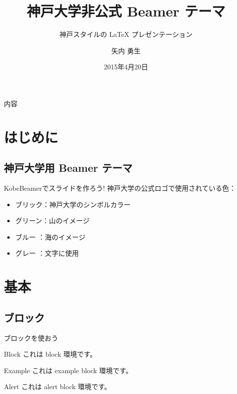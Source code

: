 \documentclass[dvipdfmx]{beamer}
\title[KobeBeamer]{神戸大学非公式 Beamer テーマ}
\subtitle{神戸スタイルの {\LaTeX} プレゼンテーション}
\author{矢内 勇生}
\institute{法学研究科}
\date{2015年4月20日}
\begin{document}
\begin{frame}
 \maketitle
\end{frame}

\begin{frame}{内容} 
  \tableofcontents
\end{frame}

\section{はじめに}
\subsection{神戸大学用 Beamer テーマ}

\begin{frame}{KobeBeamerでスライドを作ろう!}
 神戸大学の公式ロゴで使用されている色：
  \begin{itemize}
    \item \textcolor{kobebrick}{ブリック}：神戸大学のシンボルカラー
    \item \textcolor{kobegreen}{グリーン}：山のイメージ
    \item \textcolor{kobeblue}{ブルー} ：海のイメージ
    \item \textcolor{kobegray}{グレー} ：文字に使用
  \end{itemize}
\end{frame}



\section{基本}


\subsection{ブロック}

\begin{frame}{ブロックを使おう}
  \begin{block}{Block}
   これは block 環境です。
  \end{block}
  \pause
  \begin{exampleblock}{Example}
   これは example block 環境です。 
  \end{exampleblock}
 \pause
  \begin{alertblock}{Alert}
   これは alert block 環境です。
  \end{alertblock}
\end{frame}
\end{document}
